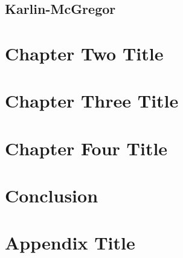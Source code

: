 \documentclass[11pt,oneside,a4paper]{report}
\begin{document}
\section{Karlin-McGregor}


\chapter{Chapter Two Title}


\chapter{Chapter Three Title}


\chapter{Chapter Four Title}


\chapter{Conclusion}


{}


\appendix
\chapter{Appendix Title}

\end{document}
